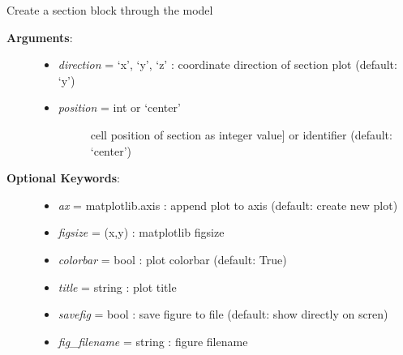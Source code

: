 \documentclass[letterpaper,10pt,english]{sphinxmanual}
\begin{document}
\begin{fulllineitems}

\begin{fulllineitems}
\label{pynoddy:pynoddy.output.NoddyOutput.plot_section}
Create a section block through the model
\begin{description}
\item[{\textbf{Arguments}:}] \leavevmode\begin{itemize}
\item {} 
\emph{direction} = `x', `y', `z' : coordinate direction of section plot (default: `y')

\item {} \begin{description}
\item[{\emph{position} = int or `center'}] \leavevmode{[}cell position of section as integer value{]}
or identifier (default: `center')

\end{description}

\end{itemize}

\item[{\textbf{Optional Keywords}:}] \leavevmode\begin{itemize}
\item {} 
\emph{ax} = matplotlib.axis : append plot to axis (default: create new plot)

\item {} 
\emph{figsize} = (x,y) : matplotlib figsize

\item {} 
\emph{colorbar} = bool : plot colorbar (default: True)

\item {} 
\emph{title} = string : plot title

\item {} 
\emph{savefig} = bool : save figure to file (default: show directly on scren)

\item {} 
\emph{fig\_filename} = string : figure filename

\end{itemize}

\end{description}

\end{fulllineitems}


\end{fulllineitems}
\end{document}
